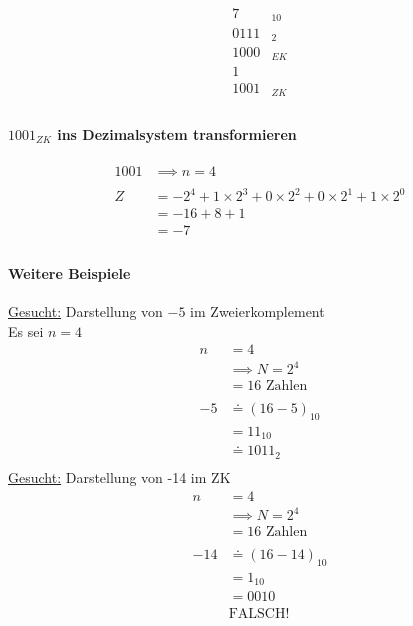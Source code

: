 \documentclass[a4paper]{scrartcl}
\begin{document}
						
							\begin{align*}
								7&_{10} \\
								0111&_{2} \\
								1000&_{EK}\\
										1&\\
								\hline
								1001&_{ZK} \\
							\end{align*}
						\paragraph{\(1001_{ZK} \) ins Dezimalsystem transformieren}
							\begin{align*}
								1001 &\implies n=4 \\
								\\
								Z &= - 2^4 + 1 \times 2^3 + 0 \times 2^2 + 0 \times 2^1 + 1 \times 2^0\\
								&= -16 + 8 +1\\
								&= -7 \\
							\end{align*}
							
						\paragraph{Weitere Beispiele}
							\ul{Gesucht:} Darstellung von \(-5\) im Zweierkomplement\\
							Es sei \( n = 4 \)\\
							\begin{align*}
								n&=4\\
								&\implies N= 2^4\\
								&= 16 \text{ Zahlen}\\
								\\
								-5& \doteq (16 - 5)_{10} \\
								&= 11_{10} \\
								&\doteq 1011_2\\ 
							\end{align*}
							\ul{Gesucht:} Darstellung von -14 im ZK
							\begin{align*}
								n&=4\\
								&\implies N= 2^4\\
								&= 16 \text{ Zahlen}\\
								\\
								-14 &\doteq (16 -14)_{10}\\
								&= 1_{10} \\
								&= 0010\\
								&\text{FALSCH!}
							\end{align*}
							
\end{document}
